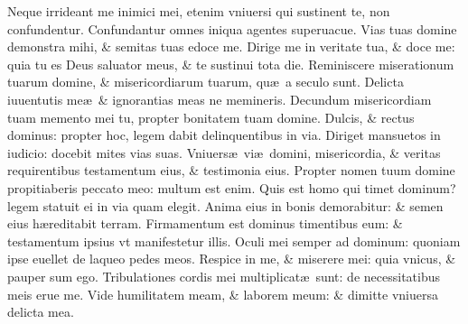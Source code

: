 \documentclass[a5paper,10pt]{book}
\def\ae{æ}
\begin{document}
\begin{multicols*}{2}
\newline \color{red} N\color{black}eque irrideant me inimici mei, etenim vniuersi qui sustinent te, non confundentur.
\newline \color{red} C\color{black}onfundantur omnes iniqua agentes superuacue.
\newline \color{red} V\color{black}ias tuas domine demonstra mihi, \& semitas tuas edoce me.
\newline \color{red} D\color{black}irige me in veritate tua, \& doce me: quia tu es Deus saluator meus, \& te sustinui tota die.
\newline \color{red} R\color{black}eminiscere miserationum tuarum domine, \& misericordiarum tuarum, qu\ae \ a seculo sunt.
\newline \color{red} D\color{black}elicta iuuentutis me\ae \ \& ignorantias meas ne memineris.
\newline \color{red} D\color{black}ecundum misericordiam tuam memento mei tu, propter bonitatem tuam domine.
\newline \color{red} D\color{black}ulcis, \& rectus dominus: propter hoc, legem dabit delinquentibus in via.
\newline \color{red} D\color{black}iriget mansuetos in iudicio: docebit mites vias suas.
\newline \color{red} V\color{black}niuers\ae \ vi\ae \ domini, misericordia, \& veritas requirentibus testamentum eius, \& testimonia eius.
\newline \color{red} P\color{black}ropter nomen tuum domine propitiaberis peccato meo: multum est enim.
\newline \color{red} Q\color{black}uis est homo qui timet dominum? legem statuit ei in via quam elegit.
\newline \color{red} A\color{black}nima eius in bonis demorabitur: \& semen eius h\ae reditabit terram.
\newline \color{red} F\color{black}irmamentum est dominus timentibus eum: \& testamentum ipsius vt manifestetur illis.
\newline \color{red} O\color{black}culi mei semper ad dominum: quoniam ipse euellet de laqueo pedes meos.
\newline \color{red} R\color{black}espice in me, \& miserere mei: quia vnicus, \& pauper sum ego.
\newline \color{red} T\color{black}ribulationes cordis mei multiplicat\ae \ sunt: de necessitatibus meis erue me.
\newline \color{red} V\color{black}ide humilitatem meam, \& laborem meum: \& dimitte vniuersa delicta mea.

\end{multicols*}
\end{document}
